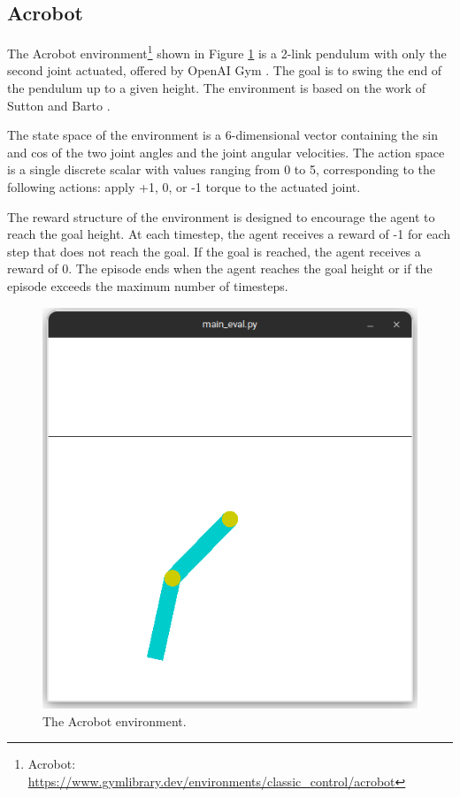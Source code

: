 \subsection{Acrobot}

The Acrobot environment\footnote{Acrobot: \url{https://www.gymlibrary.dev/environments/classic_control/acrobot}} shown in Figure \ref{fig:acrobot-env} is a 2-link pendulum with only the second joint actuated, offered by OpenAI Gym \cite{brockman2016openai}. The goal is to swing the end of the pendulum up to a given height. The environment is based on the work of Sutton and Barto \cite{sutton2018reinforcement}.

The state space of the environment is a 6-dimensional vector containing the sin and cos of the two joint angles and the joint angular velocities. The action space is a single discrete scalar with values ranging from 0 to 5, corresponding to the following actions: apply +1, 0, or -1 torque to the actuated joint.

The reward structure of the environment is designed to encourage the agent to reach the goal height. At each timestep, the agent receives a reward of -1 for each step that does not reach the goal. If the goal is reached, the agent receives a reward of 0. The episode ends when the agent reaches the goal height or if the episode exceeds the maximum number of timesteps.

\begin{figure}[htbp]
    \centerline{\includegraphics[width=\columnwidth]{./img/acrobot-env.png}}
    \caption{The Acrobot environment.}
    \label{fig:acrobot-env}
\end{figure}

